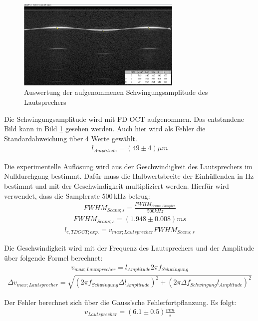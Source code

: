 \documentclass[german, %
parskip=full, %
bibliography=totoc, %
]{scrartcl}
\begin{document}
\begin{figure}[ht] 
  \centering
    \includegraphics[width=0.7\textwidth]{Amplitude_Beispiel}
  \caption{Auswertung der aufgenommenen Schwingungsamplitude des Lautsprechers}
  \label{fig:amplitude}
\end{figure}

Die Schwingungsamplitude wird mit FD OCT aufgenommen. Das entstandene Bild kann in Bild \ref{fig:amplitude} gesehen werden. Auch hier wird als Fehler die Standardabweichung über 4 Werte gewählt.
\begin{align*}
l_{Amplitude} = (49 \pm 4) \mu m
\end{align*}

Die experimentelle Auflösung wird aus der Geschwindigkeit des Lautsprechers im Nulldurchgang bestimmt. Dafür muss die Halbwertsbreite der Einhüllenden in Hz bestimmt und mit der Geschwindigkeit multipliziert werden. Hierfür wird verwendet, dass die Samplerate 500\,kHz betrug:
\begin{align}
FWHM_{Scans;s} = \frac{FWHM_{Scans;Samples}}{500 kHz}
\end{align}
\begin{align*}
FWHM_{Scans;s} = (1.948 \pm 0.008) ms
\end{align*}
\begin{align}
l_{c, TD OCT; exp.} = v_{max; Lautsprecher} FWHM_{Scans;s}
\end{align}

Die Geschwindigkeit wird mit der Frequenz des Lautsprechers und der Amplitude über folgende Formel berechnet:
\begin{align}
v_{max; Lautsprecher} = l_{Amplitude} 2 \pi f_{Schwingung} 
\end{align}
\begin{align}
\Delta v_{max; Lautsprecher} = \sqrt{(2 \pi f_{Schwingung} \Delta l_{Amplitude})^2 + (2 \pi \Delta f_{Schwingung} l_{Amplitude})^2}
\end{align}

Der Fehler berechnet sich über die Gauss'sche Fehlerfortpflanzung. Es folgt:
\begin{align*}
v_{Lautsprecher} = (6.1 \pm 0.5) \frac{mm}{s}
\end{align*}
 
\end{document}
